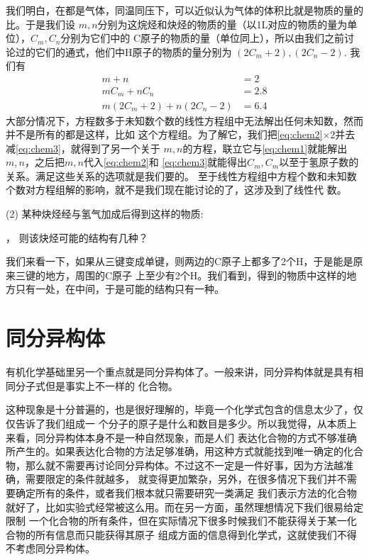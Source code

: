我们明白，在都是气体，同温同压下，可以近似认为气体的体积比就是物质的量的比。于是我们设
$m,n$分别为这烷烃和炔烃的物质的量（以1L对应的物质的量为单位），$C_m, C_n$分别为它们中的
C原子的物质的量（单位同上），所以由我们之前讨论过的它们的通式，他们中H原子的物质的量分别为
$(2C_m + 2), (2C_n - 2)$.
我们有
\begin{align}
m+n &= 2 \label{eq:chem1} \\
mC_m + nC_n &= 2.8 \label{eq:chem2} \\
m(2C_m + 2) + n(2C_n - 2) &= 6.4 \label{eq:chem3}
\end{align}
大部分情况下，方程数多于未知数个数的线性方程组中无法解出任何未知数，然而并不是所有的都是这样，比如
这个方程组。为了解它，我们把\ref{eq:chem2}$\times 2$并去减\ref{eq:chem3}，就得到了另一个关于
$m,n$的方程，联立它与\ref{eq:chem1}就能解出$m,n$，之后把$m,n$代入\ref{eq:chem2}和
\ref{eq:chem3}就能得出$C_m,C_m$以至于氢原子数的关系。满足这些关系的选项就是我们要的。
至于线性方程组中方程个数和未知数个数对方程组解的影响，就不是我们现在能讨论的了，这涉及到了线性代
数。

(2) 某种炔烃经与氢气加成后得到这样的物质:
\begin{center}
\end{center}，
则该炔烃可能的结构有几种？

我们来看一下，如果从三键变成单键，则两边的C原子上都多了2个H，于是能是原来三键的地方，周围的C原子
上至少有2个H。我们看到，得到的物质中这样的地方只有一处，在中间，于是可能的结构只有一种。

\section{同分异构体}
有机化学基础里另一个重点就是同分异构体了。一般来讲，同分异构体就是具有相同分子式但是事实上不一样的
化合物。

这种现象是十分普遍的，也是很好理解的，毕竟一个化学式包含的信息太少了，仅仅告诉了我们组成一
个分子的原子是什么和数目是多少。所以我觉得，从本质上来看，同分异构体本身不是一种自然现象，而是人们
表达化合物的方式不够准确所产生的。如果表达化合物的方法足够准确，用这种方式就能找到唯一确定的化合
物，那么就不需要再讨论同分异构体。不过这不一定是一件好事，因为方法越准确，需要限定的条件就越多，
就变得更加繁杂，另外，在很多情况下我们并不需要确定所有的条件，或者我们根本就只需要研究一类满足
我们表示方法的化合物就好了，比如实验式经常被这么用。而在另一方面，虽然理想情况下我们很易给定限制
一个化合物的所有条件，但在实际情况下很多时候我们不能获得关于某一化合物的所有信息而只能获得其原子
组成方面的信息得到化学式，这就使我们不得不考虑同分异构体。

